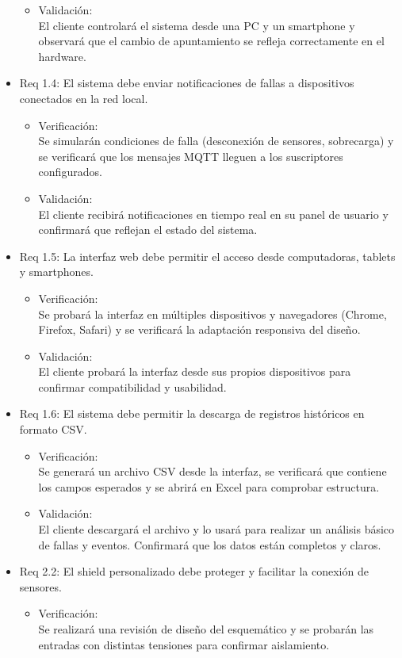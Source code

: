 \documentclass[
11pt, %
]{charter}
\begin{document}
\begin{itemize}
\begin{itemize}
	\item Validación: \\ El cliente controlará el sistema desde una PC y un smartphone y observará que el cambio de apuntamiento se refleja correctamente en el hardware.
\end{itemize}

\item Req 1.4: El sistema debe enviar notificaciones de fallas a dispositivos conectados en la red local.
\begin{itemize}
	\item Verificación: \\ Se simularán condiciones de falla (desconexión de sensores, sobrecarga) y se verificará que los mensajes MQTT lleguen a los suscriptores configurados.

	\item Validación: \\ El cliente recibirá notificaciones en tiempo real en su panel de usuario y confirmará que reflejan el estado del sistema.
\end{itemize}

\item Req 1.5: La interfaz web debe permitir el acceso desde computadoras, tablets y smartphones.
\begin{itemize}
	\item Verificación: \\ Se probará la interfaz en múltiples dispositivos y navegadores (Chrome, Firefox, Safari) y se verificará la adaptación responsiva del diseño.
	
	\item Validación: \\ El cliente probará la interfaz desde sus propios dispositivos para confirmar compatibilidad y usabilidad.
\end{itemize}

\item Req 1.6: El sistema debe permitir la descarga de registros históricos en formato CSV.
\begin{itemize}
	\item Verificación: \\ Se generará un archivo CSV desde la interfaz, se verificará que contiene los campos esperados y se abrirá en Excel para comprobar estructura.

	\item Validación: \\ El cliente descargará el archivo y lo usará para realizar un análisis básico de fallas y eventos. Confirmará que los datos están completos y claros.
\end{itemize}
\item Req 2.2: El shield personalizado debe proteger y facilitar la conexión de sensores.
\begin{itemize}
	\item Verificación: \\ Se realizará una revisión de diseño del esquemático y se probarán las entradas con distintas tensiones para confirmar aislamiento.


\end{itemize}
\end{itemize}
\end{document}

